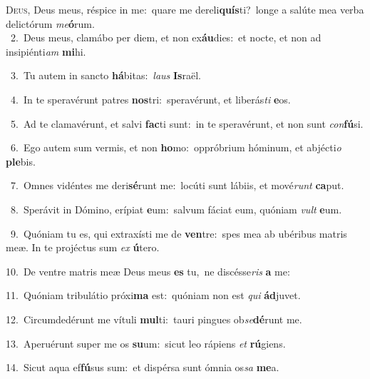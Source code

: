 \lettrine{\initial\textcolor{\initialcolor}{D}}{eus,} Deus meus, réspice in me:~\dagger quare me dereli\-\textbf{quís}\-ti?~\star longe a salúte mea verba delictórum \textit{me}\-\textbf{ó}rum.\\
{\numbfont\textcolor{\numbcolor}{~2.}}~Deus meus, clamábo per diem, et non ex\-\textbf{áu}\-dies:~\star et nocte, et non ad insipiénti\textit{am} \textbf{mi}\-hi.\par
{\numbfont\textcolor{\numbcolor}{~3.}}~Tu autem in sancto \textbf{há}\-bitas:~\star \textit{laus} \textbf{Is}\-raël.\par
{\numbfont\textcolor{\numbcolor}{~4.}}~In te speravérunt patres \textbf{nos}\-tri:~\star speravérunt, et liberás\textit{ti} \textbf{e}\-os.\par
{\numbfont\textcolor{\numbcolor}{~5.}}~Ad te clamavérunt, et salvi \textbf{fac}\-ti sunt:~\star in te speravérunt, et non sunt \textit{con}\-\textbf{fú}si.\par
{\numbfont\textcolor{\numbcolor}{~6.}}~Ego autem sum vermis, et non \textbf{ho}\-mo:~\star oppróbrium hóminum, et abjécti\textit{o} \textbf{ple}\-bis.\par
{\numbfont\textcolor{\numbcolor}{~7.}}~Omnes vidéntes me deri\-\textbf{sé}\-runt me:~\star locúti sunt lábiis, et mové\textit{runt} \textbf{ca}\-put.\par
{\numbfont\textcolor{\numbcolor}{~8.}}~Sperávit in Dómino, erípiat \textbf{e}\-um:~\star salvum fáciat eum, quóniam \textit{vult} \textbf{e}\-um.\par
{\numbfont\textcolor{\numbcolor}{~9.}}~Quóniam tu es, qui extraxísti me de \textbf{ven}\-tre:~\star spes mea ab ubéribus matris meæ. In te projéctus sum \textit{ex} \textbf{ú}\-tero.\par
{\numbfont\textcolor{\numbcolor}{10.}}~De ventre matris meæ Deus meus \textbf{es} tu,~\star ne discésse\textit{ris} \textbf{a} me:\par
{\numbfont\textcolor{\numbcolor}{11.}}~Quóniam tribulátio próxi\textbf{ma} est:~\star quóniam non est \textit{qui} \textbf{ád}\-juvet.\par
{\numbfont\textcolor{\numbcolor}{12.}}~Circumdedérunt me vítuli \textbf{mul}\-ti:~\star tauri pingues ob\-\textit{se}\-\textbf{dé}runt me.\par
{\numbfont\textcolor{\numbcolor}{13.}}~Aperuérunt super me os \textbf{su}\-um:~\star sicut leo rápiens \textit{et} \textbf{rú}\-giens.\par
{\numbfont\textcolor{\numbcolor}{14.}}~Sicut aqua ef\-\textbf{fú}\-sus sum:~\star et dispérsa sunt ómnia os\textit{sa} \textbf{me}\-a.\par
